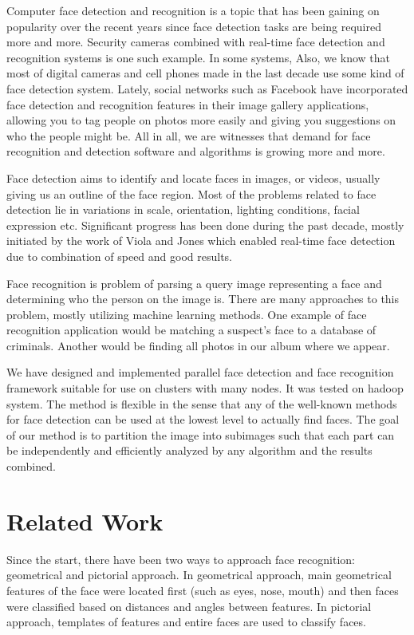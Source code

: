 \documentclass[11pt, draftclsnofoot, onecolumn]{IEEEtran}
\begin{document}
Computer face detection and recognition is a topic that has been gaining on popularity over the recent years since face detection tasks are being required more and more. Security cameras combined with real-time face detection and recognition systems is one such example. In some systems,  Also, we know that most of digital cameras and cell phones made in the last decade use some kind of face detection system. Lately, social networks such as Facebook have incorporated face detection and recognition features in their image gallery applications, allowing you to tag people on photos more easily and giving you suggestions on who the people might be. All in all, we are witnesses that demand for face recognition and detection software and algorithms is growing more and more.

Face detection aims to identify and locate faces in images, or videos, usually giving us an outline of the face region. Most of the problems related to face detection lie in variations in scale, orientation, lighting conditions, facial expression etc. Significant progress has been done during the past decade, mostly initiated by the work of Viola and Jones \cite{IWSCTV2001} which enabled real-time face detection due to combination of speed and good results.

Face recognition is problem of parsing a query image representing a face and determining who the person on the image is. There are many approaches to this problem, mostly utilizing machine learning methods. One example of face recognition application would be matching a suspect's face to a database of criminals. Another would be finding all photos in our album where we appear.

We have designed and implemented parallel face detection and face recognition framework suitable for use on clusters with many nodes. It was tested on hadoop system. The method is flexible in the sense that any of the well-known methods for face detection can be used at the lowest level to actually find faces. The goal of our method is to partition the image into subimages such that each part can be independently and efficiently analyzed by any algorithm and the results combined.

\section{Related Work} \label{sec:related}

Since the start, there have been two ways to approach face recognition: geometrical and pictorial approach. In geometrical approach, main geometrical features of the face were located first (such as eyes, nose, mouth) and then faces were classified based on distances and angles between features. In pictorial approach, templates of features and entire faces are used to classify faces.
\end{document}
